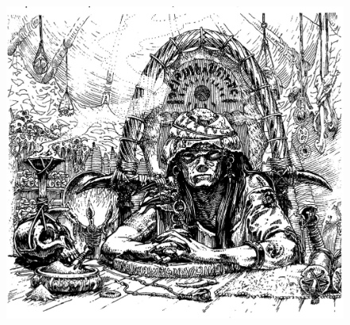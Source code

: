 


\begin{figure}[b!]
\centering
\includegraphics[width=\textwidth]{images/wizard-5.png}
\WOTC
\end{figure}



